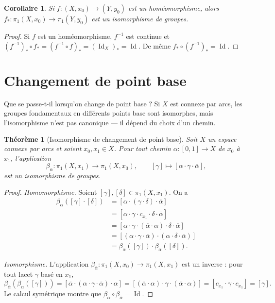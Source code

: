 \documentclass[12pt,a4paper,openany]{book}
\theoremstyle{definition}
\theoremstyle{plain}
\newtheorem{theoreme}[definition]{Théorème}
\newtheorem{corollaire}[definition]{Corollaire}
\theoremstyle{remark}
\DeclareMathOperator{\Id}{Id}
\begin{document}
\begin{corollaire}\label{cor:homeo-iso-pi1}
Si $f : (X, x_0) \to (Y, y_0)$ est un homéomorphisme, alors
$f_* : \pi_1(X, x_0) \to \pi_1(Y, y_0)$ est un isomorphisme de groupes.
\end{corollaire}

\begin{proof}
Si $f$ est un homéomorphisme, $f^{-1}$ est continue et
$(f^{-1})_* \circ f_* = (f^{-1} \circ f)_* = (\Id_X)_* = \Id$. De même
$f_* \circ (f^{-1})_* = \Id$.
\end{proof}

\section{Changement de point base}\label{sec:changement-base}

Que se passe-t-il lorsqu'on change de point base ? Si $X$ est connexe par arcs,
les groupes fondamentaux en différents points base sont isomorphes, mais
l'isomorphisme n'est pas canonique --- il dépend du choix d'un chemin.

\begin{theoreme}[Isomorphisme de changement de point base]\label{thm:changement-base}
Soit $X$ un espace connexe par arcs et soient $x_0, x_1 \in X$. Pour tout
chemin $\alpha : [0,1] \to X$ de $x_0$ à $x_1$, l'application
\[
\beta_\alpha : \pi_1(X, x_1) \longrightarrow \pi_1(X, x_0), \qquad [\gamma] \longmapsto [\alpha \cdot \gamma \cdot \overline{\alpha}],
\]
est un isomorphisme de groupes.
\end{theoreme}

\begin{proof}
\emph{Homomorphisme.} Soient $[\gamma], [\delta] \in \pi_1(X, x_1)$. On a
\begin{align*}
\beta_\alpha([\gamma] \cdot [\delta])
&= [\alpha \cdot (\gamma \cdot \delta) \cdot \overline{\alpha}] \\
&= [\alpha \cdot \gamma \cdot c_{x_1} \cdot \delta \cdot \overline{\alpha}] \\
&= [\alpha \cdot \gamma \cdot (\overline{\alpha} \cdot \alpha) \cdot \delta \cdot \overline{\alpha}] \\
&= [(\alpha \cdot \gamma \cdot \overline{\alpha}) \cdot (\alpha \cdot \delta \cdot \overline{\alpha})] \\
&= \beta_\alpha([\gamma]) \cdot \beta_\alpha([\delta]).
\end{align*}

\emph{Isomorphisme.} L'application $\beta_{\overline{\alpha}} : \pi_1(X, x_0) \to \pi_1(X, x_1)$ est un inverse : pour tout lacet $\gamma$ basé en $x_1$,
\[
\beta_{\overline{\alpha}}(\beta_\alpha([\gamma])) = [\overline{\alpha} \cdot (\alpha \cdot \gamma \cdot \overline{\alpha}) \cdot \alpha] = [(\overline{\alpha} \cdot \alpha) \cdot \gamma \cdot (\overline{\alpha} \cdot \alpha)] = [c_{x_1} \cdot \gamma \cdot c_{x_1}] = [\gamma].
\]
Le calcul symétrique montre que $\beta_\alpha \circ \beta_{\overline{\alpha}} = \Id$.
\end{proof}
\end{document}
